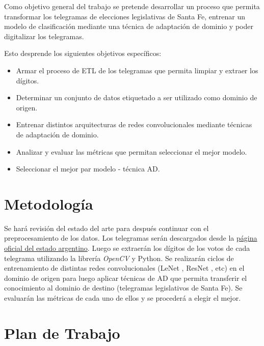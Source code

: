 \documentclass[a4paper, twoside]{report}
\begin{document}
Como objetivo general del trabajo se pretende desarrollar un proceso que permita transformar los telegramas de
elecciones legislativas de Santa Fe, entrenar un modelo de clasificaci\'on mediante una t\'ecnica de adaptaci\'on de
dominio y poder digitalizar los telegramas.

Esto desprende los siguientes objetivos espec\'ificos:
\begin{itemize}
	\item Armar el proceso de ETL de los telegramas que permita limpiar y extraer los d\'igitos.
	\item Determinar un conjunto de datos etiquetado a ser utilizado como dominio de origen.
	\item Entrenar distintos arquitecturas de redes convolucionales mediante t\'ecnicas de adaptaci\'on de dominio.
	\item Analizar y evaluar las m\'etricas que permitan seleccionar el mejor modelo.
	\item Seleccionar el mejor par modelo - t\'ecnica AD.
\end{itemize}

\section*{Metodología}

Se har\'a revisi\'on del estado del arte para despu\'es continuar con el preprocesamiento de los datos. Los telegramas
ser\'an descargados desde la \href{https://op.elecciones.gob.ar/telegramas/generales2021/}{p\'agina oficial del estado
	argentino}. Luego se extraer\'an los d\'igitos de los votos de cada telegrama utilizando la librer\'ia {\it OpenCV}
\cite{opencv_library} y Python. Se realizar\'an ciclos de entrenamiento de distintas redes convolucionales (LeNet
\cite{lecun1998gradient}, ResNet \cite{he2016deep}, etc) en el dominio de origen para luego aplicar t\'ecnicas de AD
que permita transferir el conocimiento al dominio de destino (telegramas legislativos de Santa Fe). Se evaluar\'an las
m\'etricas de cada uno de ellos y se proceder\'a a elegir el mejor.

\section*{Plan de Trabajo}
\end{document}

